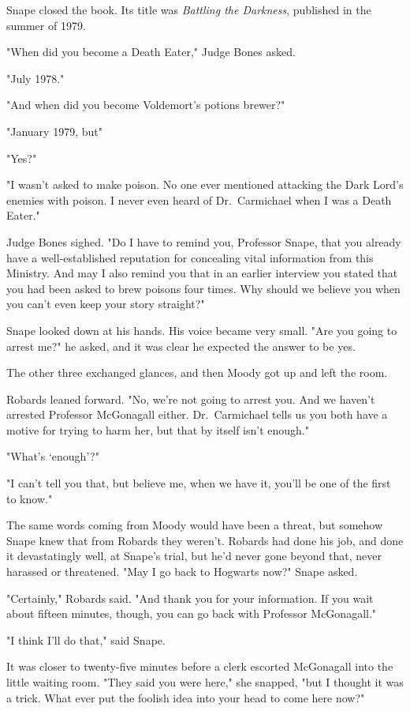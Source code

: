 Snape closed the book. Its title was \emph{Battling the Darkness}, published in the summer of 1979.

"When did you become a Death Eater," Judge Bones asked.

"July 1978."

"And when did you become Voldemort's potions brewer?"

"January 1979, but{\el}"

"Yes?"

"I wasn't asked to make poison. No one ever mentioned attacking the Dark Lord's enemies with poison. I never even heard of Dr.~Carmichael when I was a Death Eater."

Judge Bones sighed. "Do I have to remind you, Professor Snape, that you already have a well-established reputation for concealing vital information from this Ministry. And may I also remind you that in an earlier interview you stated that you had been asked to brew poisons four times. Why should we believe you when you can't even keep your story straight?"

Snape looked down at his hands. His voice became very small. "Are you going to arrest me?" he asked, and it was clear he expected the answer to be yes.

The other three exchanged glances, and then Moody got up and left the room.

Robards leaned forward. "No, we're not going to arrest you. And we haven't arrested Professor McGonagall either. Dr.~Carmichael tells us you both have a motive for trying to harm her, but that by itself isn't enough."

"What's `enough'?"

"I can't tell you that, but believe me, when we have it, you'll be one of the first to know."

The same words coming from Moody would have been a threat, but somehow Snape knew that from Robards they weren't. Robards had done his job, and done it devastatingly well, at Snape's trial, but he'd never gone beyond that, never harassed or threatened. "May I go back to Hogwarts now?" Snape asked.

"Certainly," Robards said. "And thank you for your information. If you wait about fifteen minutes, though, you can go back with Professor McGonagall."

"I think I'll do that," said Snape.

It was closer to twenty-five minutes before a clerk escorted McGonagall into the little waiting room. "They said you were here," she snapped, "but I thought it was a trick. What ever put the foolish idea into your head to come here now?"

